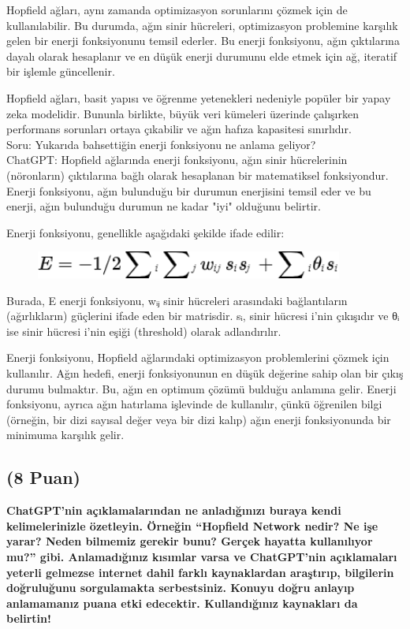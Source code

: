 \documentclass[11pt]{article}
\begin{document}
Hopfield ağları, aynı zamanda optimizasyon sorunlarını çözmek için de kullanılabilir. Bu durumda, ağın sinir hücreleri, optimizasyon problemine karşılık gelen bir enerji fonksiyonunu temsil ederler. Bu enerji fonksiyonu, ağın çıktılarına dayalı olarak hesaplanır ve en düşük enerji durumunu elde etmek için ağ, iteratif bir işlemle güncellenir.

Hopfield ağları, basit yapısı ve öğrenme yetenekleri nedeniyle popüler bir yapay zeka modelidir. Bununla birlikte, büyük veri kümeleri üzerinde çalışırken performans sorunları ortaya çıkabilir ve ağın hafıza kapasitesi sınırlıdır.\\

Soru: Yukarıda bahsettiğin enerji fonksiyonu ne anlama geliyor?\\

ChatGPT: Hopfield ağlarında enerji fonksiyonu, ağın sinir hücrelerinin (nöronların) çıktılarına bağlı olarak hesaplanan bir matematiksel fonksiyondur. Enerji fonksiyonu, ağın bulunduğu bir durumun enerjisini temsil eder ve bu enerji, ağın bulunduğu durumun ne kadar "iyi" olduğunu belirtir.

Enerji fonksiyonu, genellikle aşağıdaki şekilde ifade edilir:

\begin{figure}[ht!]
    \centering
    \includegraphics[width=0.9\textwidth]{lagrida_latex_editor.png}
    \label{fig:my_pic}
\end{figure}

Burada, E enerji fonksiyonu, wᵢⱼ sinir hücreleri arasındaki bağlantıların (ağırlıkların) güçlerini ifade eden bir matrisdir. sᵢ, sinir hücresi i'nin çıkışıdır ve θᵢ ise sinir hücresi i'nin eşiği (threshold) olarak adlandırılır.

Enerji fonksiyonu, Hopfield ağlarındaki optimizasyon problemlerini çözmek için kullanılır. Ağın hedefi, enerji fonksiyonunun en düşük değerine sahip olan bir çıkış durumu bulmaktır. Bu, ağın en optimum çözümü bulduğu anlamına gelir. Enerji fonksiyonu, ayrıca ağın hatırlama işlevinde de kullanılır, çünkü öğrenilen bilgi (örneğin, bir dizi sayısal değer veya bir dizi kalıp) ağın enerji fonksiyonunda bir minimuma karşılık gelir.

\subsection{(8 Puan)} \textbf{ChatGPT’nin açıklamalarından ne anladığınızı buraya kendi kelimelerinizle özetleyin. Örneğin ``Hopfield Network nedir? Ne işe yarar? Neden bilmemiz gerekir bunu? Gerçek hayatta kullanılıyor mu?'' gibi. Anlamadığınız kısımlar varsa ve ChatGPT’nin açıklamaları yeterli gelmezse internet dahil farklı kaynaklardan araştırıp, bilgilerin doğruluğunu sorgulamakta serbestsiniz. Konuyu doğru anlayıp anlamamanız puana etki edecektir. Kullandığınız kaynakları da belirtin!}
\end{document}
